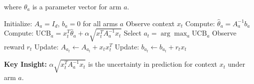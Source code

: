 where $\theta_a$ is a parameter vector for arm $a$.

\begin{algorithm}[H]
\caption{LinUCB}
\begin{algorithmic}
\STATE Initialize: $A_a = I_d$, $b_a = 0$ for all arms $a$
    \STATE Observe context $x_t$
        \STATE Compute: $\hat{\theta}_a = A_a^{-1} b_a$
        \STATE Compute: UCB$_a = x_t^T \hat{\theta}_a + \alpha \sqrt{x_t^T A_a^{-1} x_t}$
    \ENDFOR
    \STATE Select $a_t = \arg\max_a \text{UCB}_a$
    \STATE Observe reward $r_t$
    \STATE Update: $A_{a_t} \leftarrow A_{a_t} + x_t x_t^T$
    \STATE Update: $b_{a_t} \leftarrow b_{a_t} + r_t x_t$
\ENDFOR
\end{algorithmic}
\end{algorithm}

\textbf{Key Insight:} $\alpha \sqrt{x_t^T A_a^{-1} x_t}$ is the uncertainty in prediction for context $x_t$ under arm $a$.

